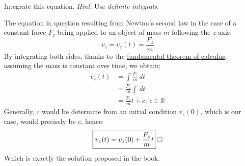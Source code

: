 \documentclass[solutions.tex]{subfiles}
\begin{document}
\maketitle
\begin{exercise}
Integrate this equation. \textit{Hint}: Use \textit{definite
integrals}.
\end{exercise}
The equation in question resulting from Newton's second law in
the case of a constant force $F_z$ being applied to an object
of mass $m$ following the $z$-axis:
\[
	\dot{v_z} = \dot{v_z(t)} = \frac{F_z}{m}
\]
By integrating both sides, thanks to the
\href{https://en.wikipedia.org/wiki/Fundamental\_theorem_of\_calculus}
{fundamental theorem of calculus}, assuming the mass is constant over
time, we obtain:
\begin{align*}
	v_z(t) &= \int \frac{F_z}{m}\,dt \\
	~ &= \frac{F_z}{m}\int\,dt \\
	~ &= \frac{F_z}{m}t + c,\,c\in\mathbb{R}
\end{align*}
Generally, $c$ would be determine from an initial condition $v_z(0)$,
which is our case, would precisely be $c$, hence:
\[
	\boxed{v_z(t) = v_z(0) + \frac{F_z}{m}t}\qed
\]
Which is exactly the solution proposed in the book.
\end{document}
